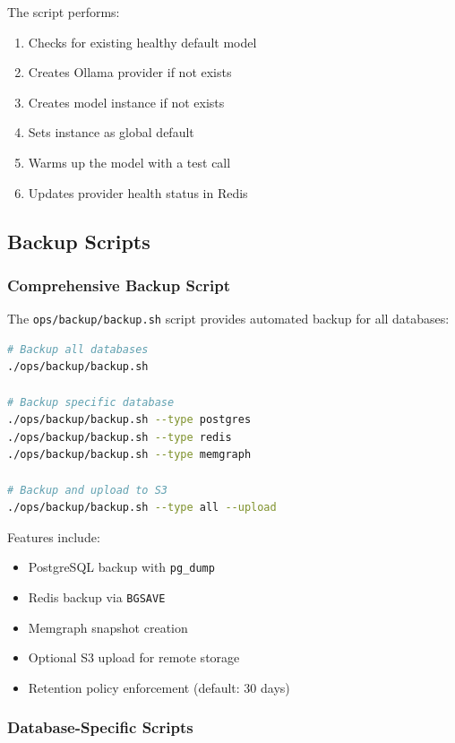 The script performs:
\begin{enumerate}
    \item Checks for existing healthy default model
    \item Creates Ollama provider if not exists
    \item Creates model instance if not exists
    \item Sets instance as global default
    \item Warms up the model with a test call
    \item Updates provider health status in Redis
\end{enumerate}

\subsection{Backup Scripts}

\subsubsection{Comprehensive Backup Script}

The \texttt{ops/backup/backup.sh} script provides automated backup for all databases:

\begin{lstlisting}[language=bash, caption=Backup script usage]
# Backup all databases
./ops/backup/backup.sh

# Backup specific database
./ops/backup/backup.sh --type postgres
./ops/backup/backup.sh --type redis
./ops/backup/backup.sh --type memgraph

# Backup and upload to S3
./ops/backup/backup.sh --type all --upload
\end{lstlisting}

Features include:
\begin{itemize}
    \item PostgreSQL backup with \texttt{pg\_dump}
    \item Redis backup via \texttt{BGSAVE}
    \item Memgraph snapshot creation
    \item Optional S3 upload for remote storage
    \item Retention policy enforcement (default: 30 days)
\end{itemize}

\subsubsection{Database-Specific Scripts}

